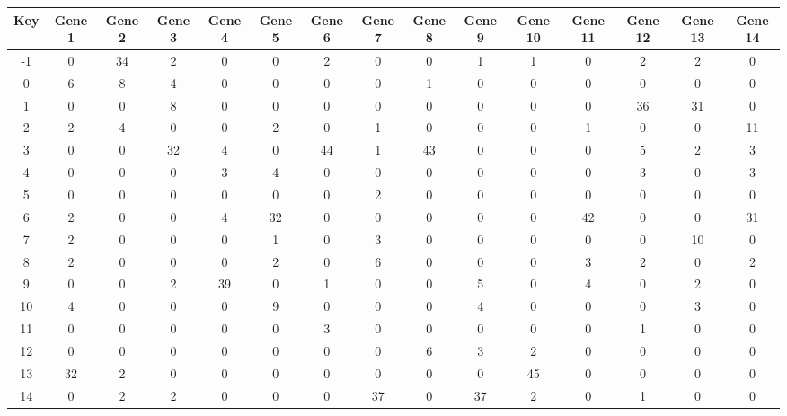 \begin{tabular}{|c|c|c|c|c|c|c|c|c|c|c|c|c|c|c|}
\hline
Key & Gene 1 & Gene 2 & Gene 3 & Gene 4 & Gene 5 & Gene 6 & Gene 7 & Gene 8 & Gene 9 & Gene 10 & Gene 11 & Gene 12 & Gene 13 & Gene 14 \\
\hline
-1 & 0 & 34 & 2 & 0 & 0 & 2 & 0 & 0 & 1 & 1 & 0 & 2 & 2 & 0 \\
0 & 6 & 8 & 4 & 0 & 0 & 0 & 0 & 1 & 0 & 0 & 0 & 0 & 0 & 0 \\
1 & 0 & 0 & 8 & 0 & 0 & 0 & 0 & 0 & 0 & 0 & 0 & 36 & 31 & 0 \\
2 & 2 & 4 & 0 & 0 & 2 & 0 & 1 & 0 & 0 & 0 & 1 & 0 & 0 & 11 \\
3 & 0 & 0 & 32 & 4 & 0 & 44 & 1 & 43 & 0 & 0 & 0 & 5 & 2 & 3 \\
4 & 0 & 0 & 0 & 3 & 4 & 0 & 0 & 0 & 0 & 0 & 0 & 3 & 0 & 3 \\
5 & 0 & 0 & 0 & 0 & 0 & 0 & 2 & 0 & 0 & 0 & 0 & 0 & 0 & 0 \\
6 & 2 & 0 & 0 & 4 & 32 & 0 & 0 & 0 & 0 & 0 & 42 & 0 & 0 & 31 \\
7 & 2 & 0 & 0 & 0 & 1 & 0 & 3 & 0 & 0 & 0 & 0 & 0 & 10 & 0 \\
8 & 2 & 0 & 0 & 0 & 2 & 0 & 6 & 0 & 0 & 0 & 3 & 2 & 0 & 2 \\
9 & 0 & 0 & 2 & 39 & 0 & 1 & 0 & 0 & 5 & 0 & 4 & 0 & 2 & 0 \\
10 & 4 & 0 & 0 & 0 & 9 & 0 & 0 & 0 & 4 & 0 & 0 & 0 & 3 & 0 \\
11 & 0 & 0 & 0 & 0 & 0 & 3 & 0 & 0 & 0 & 0 & 0 & 1 & 0 & 0 \\
12 & 0 & 0 & 0 & 0 & 0 & 0 & 0 & 6 & 3 & 2 & 0 & 0 & 0 & 0 \\
13 & 32 & 2 & 0 & 0 & 0 & 0 & 0 & 0 & 0 & 45 & 0 & 0 & 0 & 0 \\
14 & 0 & 2 & 2 & 0 & 0 & 0 & 37 & 0 & 37 & 2 & 0 & 1 & 0 & 0 \\
\hline
\end{tabular}